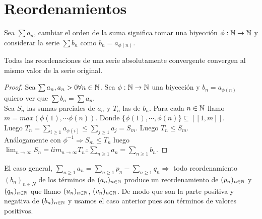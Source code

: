 \section{Reordenamientos}

\begin{definition}
  Sea $\sum a_n$, cambiar el orden de la suma significa tomar una biyección $\phi: \mathbb{N} \to \mathbb{N}$ y considerar la serie $\sum b_n$ como $b_n = a_{\phi(n)}$.
\end{definition}

\begin{theorem}
  Todas las reordenaciones de una serie absolutamente convergente convergen al mismo valor de la serie original.
  \begin{proof}
    Sea $\sum a_n, a_n > 0 \forall n \in \mathbb{N}$. Sea $\phi: \mathbb{N} \to \mathbb{N}$ una biyección y $b_n = a_{\phi(n)}$ quiero ver que $\sum b_n = \sum a_n$. \\
    Sea $S_n$ las sumas parciales de $a_n$ y $T_n$ las de $b_n$. Para cada $n \in \mathbb{N}$ llamo $m = max(\phi(1), \cdots \phi(n))$. Donde $\{ \phi(1), \cdots, \phi(n) \} \subseteq [[1, m]]$. \\
    Luego $T_n = \sum_{i \geq 1} a_{\phi(i)} \leq \sum_{j \geq 1} a_j = S_m$. Luego $T_n \leq S_m$. \\
    Análogamente con $\phi^{-1} \Rightarrow S_m \leq T_n$ luego $\lim_{n \to \infty} S_n = lim_{n \to \infty} T_n \therefore \sum_{n \geq 1} a_n = \sum_{n \geq 1} b_n$. 
  \end{proof}
\end{theorem}

El caso general, $\sum_{n \geq 1} a_n = \sum_{n \geq 1} p_n - \sum_{n \geq 1} q_n \Rightarrow$ todo reordenamiento $(b_n)_{n \in N}$ de los términos de $(a_n)_{n \in \mathbb{N}}$ produce un reordenamiento de $(p_n)_{n \in \mathbb{N}}$ y $(q_n)_{n \in \mathbb{N}}$ que llamo $(u_n)_{n \in \mathbb{N}}$, $(v_n)_{n \in \mathbb{N}}$. De modo que son la parte positiva y negativa de $(b_n)_{n \in \mathbb{N}}$ y usamos el caso anterior pues son términos de valores positivos.  



